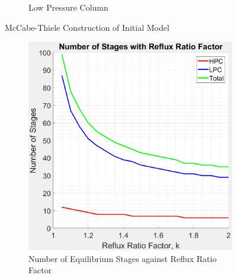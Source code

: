\begin{figure}[ht]
\begin{subfigure}{0.49\textwidth}
            \caption{Low Pressure Column}
            \label{fig:LPC_v0}
        \end{subfigure}
        \caption{McCabe-Thiele Construction of Initial Model}                        \label{fig:mccabe_v0}
    \end{figure}
    
    \begin{figure}[ht]
        \begin{subfigure}{0.49\textwidth}
            \centering
            \includegraphics[width=\linewidth]{airseparation/handouts/graphics/graph-stages_vs_R_va.jpeg}
            \caption{Number of Equilibrium Stages against \newline Reflux Ratio Factor}
            \label{fig:stage_vs_R}
        \end{subfigure}
        \hspace*{\fill} %
        \begin{subfigure}{0.49\textwidth}
            \centering

\end{subfigure}
\end{figure}
